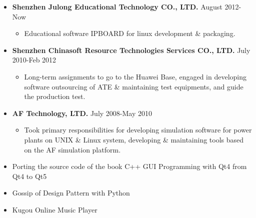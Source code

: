 \documentclass[a4paper, 10pt, titlepage]{article}
\begin{document}
\begin{itemize}

\item \textbf{Shenzhen Julong Educational Technology CO., LTD.} \hfill \textrm{August 2012-Now}
  \begin{itemize}
    \item Educational software IPBOARD for linux development \& packaging.
  \end{itemize}

\item \textbf{Shenzhen Chinasoft Resource Technologies Services CO., LTD.} \hfill \textrm{July 2010-Feb 2012}
  \begin{itemize}
  \item Long-term assignments to go to the Huawei Base, engaged in developing software outsourcing of ATE \& maintaining test equipments, and guide the production test.
  \end{itemize}

\item \textbf{AF Technology, LTD.} \hfill \textrm{July 2008-May 2010}
  \begin{itemize}
  \item Took primary responsibilities for developing simulation software for power plants on UNIX \& Linux system, developing \& maintaining tools based on the AF simulation platform.
  \end{itemize} 

\end{itemize}


\begin{itemize}
\item Porting the source code of the book C++ GUI Programming with Qt4 from Qt4 to Qt5

\item Gossip of Design Pattern with Python

\item Kugou Online Music Player
\end{itemize}
\end{document}
